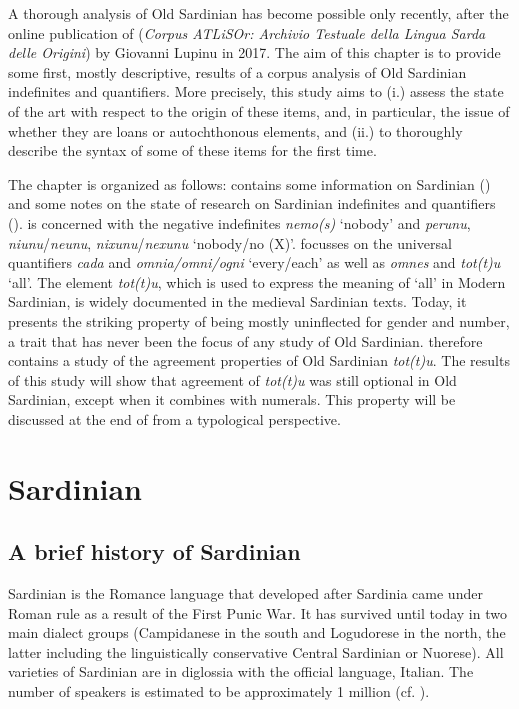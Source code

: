 \documentclass[output=paper,colorlinks,citecolor=brown]{langscibook}
\begin{document}
A thorough analysis of Old Sardinian has become possible only recently, after the online publication of  (\textit{Corpus ATLiSOr: Archivio Testuale della Lingua Sarda delle Origini}) by Giovanni Lupinu in 2017. The aim of this chapter is to provide some first, mostly descriptive, results of a corpus analysis of  Old Sardinian indefinites and quantifiers. More precisely, this study aims to (i.) assess the state of the art with respect to the origin of these items, and, in particular, the issue of whether they are loans or autochthonous elements, and (ii.) to thoroughly describe the syntax of some of these items for the first time.\largerpage

The chapter is organized as follows:   contains some information on Sardinian () and some notes on the state of research on Sardinian indefinites and quantifiers ().  is concerned with the negative indefinites \textit{nemo(s)} ‘nobody’ and \textit{perunu}, \textit{niunu}/\textit{neunu}, \textit{nixunu}/\textit{nexunu} ‘nobody/no (X)’.  focusses on the universal quantifiers \textit{cada} and \textit{omnia/omni/ogni} ‘every/each’ as well as \textit{omnes} and \textit{tot(t)u} ‘all’. The element \textit{tot(t)u}, which is used to express the meaning of ‘all’ in Modern Sardinian, is widely documented in the medieval Sardinian texts. Today, it presents the striking property of being mostly uninflected for gender and number, a trait that has never been the focus of any study of Old Sardinian.   therefore contains a study of the agreement properties of Old Sardinian \textit{tot(t)u}. The results of this study will show that agreement of \textit{tot(t)u} was still optional in Old Sardinian, except when it combines with numerals. This property will be discussed at the end of  from a typological perspective. 


\section{Sardinian}\label{sec:men2}\largerpage[2]

\subsection{A brief history of Sardinian}\label{sec:men2.1}
Sardinian is the Romance language that developed after Sardinia came under Roman rule as a result of the First Punic War. It has survived until today in two main dialect groups (Campidanese in the south and Logudorese in the north, the latter including the linguistically conservative Central Sardinian or Nuorese). All varieties of Sardinian are in diglossia with the official language, Italian. The number of speakers is estimated to be approximately 1 million (cf. \cite{Moseley2007}).
\end{document}
